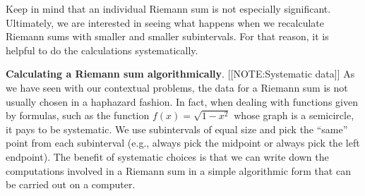 Keep in mind that an individual Riemann sum is not especially
significant.  Ultimately, we are interested in seeing what happens
when we recalculate Riemann sums with smaller and smaller
subintervals.  For that reason, it is helpful to do the calculations
systematically.






{\bf Calculating a Riemann sum algorithmically}.  
[[NOTE:Systematic data]]
As we have seen with our contextual problems, the data for a Riemann
sum is not usually chosen in a haphazard fashion.  In fact, when
dealing with functions given by formulas, such as the function $f(x) =
\sqrt{1 - x^2}$ whose graph is a semicircle, it pays to be systematic.
We use subintervals of equal size and pick the ``same'' point from
each subinterval (e.g., always pick the midpoint or always pick the
left endpoint).  The benefit of systematic choices is that we can
write down the computations involved in a Riemann sum in a simple
algorithmic form that can be carried out on a computer.

